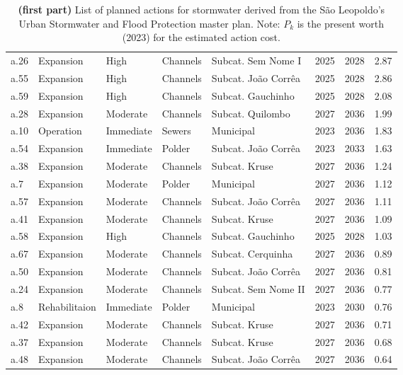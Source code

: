 \documentclass[12pt]{article}
\begin{document}
\begin{table}[t]
\begin{tabular}{lllllrrr}
a.26 &     Expansion &      High & Channels &  Subcat. Sem Nome I &   2025 & 2028 &  2.87 \\
a.55 &     Expansion &      High & Channels & Subcat. João Corrêa &   2025 & 2028 &  2.86 \\
a.59 &     Expansion &      High & Channels &   Subcat. Gauchinho &   2025 & 2028 &  2.08 \\
a.28 &     Expansion &  Moderate & Channels &    Subcat. Quilombo &   2027 & 2036 &  1.99 \\
a.10 &     Operation & Immediate &   Sewers &           Municipal &   2023 & 2036 &  1.83 \\
a.54 &     Expansion & Immediate &   Polder & Subcat. João Corrêa &   2023 & 2033 &  1.63 \\
a.38 &     Expansion &  Moderate & Channels &       Subcat. Kruse &   2027 & 2036 &  1.24 \\
 a.7 &     Expansion &  Moderate &   Polder &           Municipal &   2027 & 2036 &  1.12 \\
a.57 &     Expansion &  Moderate & Channels & Subcat. João Corrêa &   2027 & 2036 &  1.11 \\
a.41 &     Expansion &  Moderate & Channels &       Subcat. Kruse &   2027 & 2036 &  1.09 \\
a.58 &     Expansion &      High & Channels &   Subcat. Gauchinho &   2025 & 2028 &  1.03 \\
a.67 &     Expansion &  Moderate & Channels &   Subcat. Cerquinha &   2027 & 2036 &  0.89 \\
a.50 &     Expansion &  Moderate & Channels & Subcat. João Corrêa &   2027 & 2036 &  0.81 \\
a.24 &     Expansion &  Moderate & Channels & Subcat. Sem Nome II &   2027 & 2036 &  0.77 \\
 a.8 & Rehabilitaion & Immediate &   Polder &           Municipal &   2023 & 2030 &  0.76 \\
a.42 &     Expansion &  Moderate & Channels &       Subcat. Kruse &   2027 & 2036 &  0.71 \\
a.37 &     Expansion &  Moderate & Channels &       Subcat. Kruse &   2027 & 2036 &  0.68 \\
a.48 &     Expansion &  Moderate & Channels & Subcat. João Corrêa &   2027 & 2036 &  0.64 \\
\bottomrule
\end{tabular}
\caption{ \textbf{(first part)} List of planned actions for stormwater derived from the São Leopoldo's Urban Stormwater and Flood Protection master plan. Note: $P_k$ is the present worth (2023) for the estimated action cost.}
\label{tab:actions_1}
\end{table}
\end{document}
